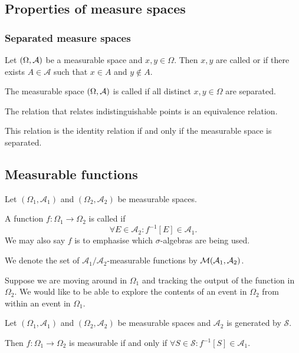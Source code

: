 \subsection{Properties of measure spaces}
\subsubsection{Separated measure spaces}
\begin{definition}
Let $\left( \Omega,\mathcal{A} \right)$ be a measurable space and $x,y\in \Omega$. Then $x,y$ are called  or  if there exists $A\in \mathcal{A}$ such that $x\in A$ and $y\notin A$.

The measurable space $\left( \Omega,\mathcal{A} \right)$ is called  if all distinct $x,y\in \Omega$ are separated.
\end{definition}

\begin{lemma}
The relation that relates indistinguishable points is an equivalence relation.

This relation is the identity relation \textup{if and only if} the measurable space is separated.
\end{lemma}

\subsection{Measurable functions}
\begin{definition}
Let $(\Omega_1, \mathcal{A}_1)$ and $(\Omega_2, \mathcal{A}_2)$ be measurable spaces.

A function $f:\Omega_1 \to \Omega_2$ is called  if
\[ \forall E\in\mathcal{A}_2: f^{-1}[E] \in\mathcal{A}_1. \]
We may also say $f$ is  to emphasise which $\sigma$-algebras are being used.

We denote the set of $\mathcal{A}_1/\mathcal{A}_2$-measurable functions by $\operatorname{\mathcal{M}}(\mathcal{A}_1, \mathcal{A}_2)$.
\end{definition}
Suppose we are moving around in $\Omega_1$ and tracking the output of the function in $\Omega_2$. We would like to be able to explore the contents of an event in $\Omega_2$ from within an event in $\Omega_1$.

\begin{lemma} \label{measurableFromGeneratingSet}
Let $(\Omega_1, \mathcal{A}_1)$ and $(\Omega_2, \mathcal{A}_2)$ be measurable spaces and $\mathcal{A}_2$ is generated by $\mathcal{S}$.

Then $f: \Omega_1\to \Omega_2$ is measurable \textup{if and only if} $\forall S\in\mathcal{S}: f^{-1}[S] \in \mathcal{A}_1$.
\end{lemma}

